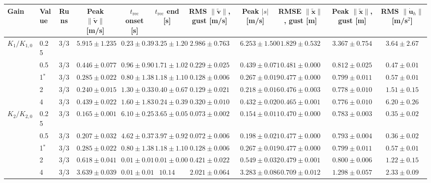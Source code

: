 \begin{tabular}{ll ccccccccc}
\toprule
Gain & Value & Runs & Peak $\|\tilde{\mathbf{v}}\|$ [m/s] & $t_{\mathrm{rec}}$ onset [s] & $t_{\mathrm{rec}}$ end [s] & RMS $\|\tilde{\mathbf{v}}\|$, gust [m/s] & Peak $|s|$ [m/s] & RMSE $\|\tilde{\mathbf{x}}\|$, gust [m] & Peak $\|\tilde{\mathbf{x}}\|$, gust [m] & RMS $\|\dot{\mathbf{u}}_h\|$ [m/s$^2$] \\
\midrule
$K_1/K_{1,0}$ & 0.25 & 3/3 & $5.915 \pm 1.235$ & $0.23 \pm 0.39$ & $3.25 \pm 1.20$ & $2.986 \pm 0.763$ & $6.253 \pm 1.500$ & $1.829 \pm 0.532$ & $3.367 \pm 0.754$ & $3.64 \pm 2.67$ \\
 & 0.5 & 3/3 & $0.446 \pm 0.077$ & $0.96 \pm 0.90$ & $1.71 \pm 1.02$ & $0.229 \pm 0.025$ & $0.439 \pm 0.071$ & $0.481 \pm 0.000$ & $0.812 \pm 0.025$ & $0.47 \pm 0.01$ \\
 & 1$^{\ast}$ & 3/3 & $0.285 \pm 0.022$ & $0.80 \pm 1.38$ & $1.18 \pm 1.10$ & $0.128 \pm 0.006$ & $0.267 \pm 0.019$ & $0.477 \pm 0.000$ & $0.799 \pm 0.011$ & $0.57 \pm 0.01$ \\
 & 2 & 3/3 & $0.240 \pm 0.015$ & $1.30 \pm 0.33$ & $0.40 \pm 0.67$ & $0.129 \pm 0.021$ & $0.218 \pm 0.016$ & $0.476 \pm 0.003$ & $0.778 \pm 0.010$ & $1.51 \pm 0.15$ \\
 & 4 & 3/3 & $0.439 \pm 0.022$ & $1.60 \pm 1.83$ & $0.24 \pm 0.39$ & $0.320 \pm 0.010$ & $0.432 \pm 0.020$ & $0.465 \pm 0.001$ & $0.776 \pm 0.010$ & $6.20 \pm 0.26$ \\
\midrule
$K_2/K_{2,0}$ & 0.25 & 3/3 & $0.165 \pm 0.001$ & $6.10 \pm 0.25$ & $3.65 \pm 0.05$ & $0.073 \pm 0.002$ & $0.154 \pm 0.011$ & $0.470 \pm 0.000$ & $0.783 \pm 0.003$ & $0.35 \pm 0.02$ \\
 & 0.5 & 3/3 & $0.207 \pm 0.032$ & $4.62 \pm 0.37$ & $3.97 \pm 0.92$ & $0.072 \pm 0.006$ & $0.198 \pm 0.021$ & $0.477 \pm 0.000$ & $0.793 \pm 0.004$ & $0.36 \pm 0.02$ \\
 & 1$^{\ast}$ & 3/3 & $0.285 \pm 0.022$ & $0.80 \pm 1.38$ & $1.18 \pm 1.10$ & $0.128 \pm 0.006$ & $0.267 \pm 0.019$ & $0.477 \pm 0.000$ & $0.799 \pm 0.011$ & $0.57 \pm 0.01$ \\
 & 2 & 3/3 & $0.618 \pm 0.041$ & $0.01 \pm 0.01$ & $0.01 \pm 0.00$ & $0.421 \pm 0.022$ & $0.549 \pm 0.032$ & $0.479 \pm 0.001$ & $0.800 \pm 0.006$ & $1.22 \pm 0.15$ \\
 & 4 & 3/3 & $3.639 \pm 0.039$ & $0.01 \pm 0.01$ & $10.14$ & $2.021 \pm 0.064$ & $3.283 \pm 0.086$ & $0.709 \pm 0.012$ & $1.298 \pm 0.057$ & $2.33 \pm 0.09$ \\
\bottomrule
\end{tabular}
